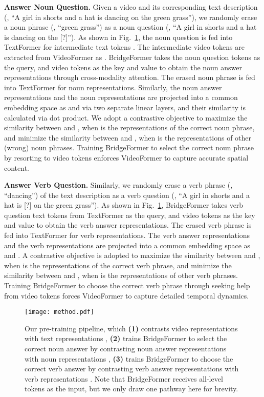 \documentclass[10pt,twocolumn,letterpaper]{article}
\begin{document}
{\flushleft \bf Answer Noun Question.} Given a video and its corresponding text description (\eg, ``A girl in shorts and a hat is dancing on the green grass''), we randomly erase a noun phrase (\eg, ``green grass'') as a noun question (\eg, ``A girl in shorts and a hat is dancing on the [?]''). As shown in Fig.~\ref{fig:method}, the noun question is fed into TextFormer for intermediate text tokens . The intermediate video tokens are extracted from VideoFormer as .  BridgeFormer takes the noun question tokens  as the query, and video tokens  as the key and value to obtain the noun answer representations through cross-modality attention. The erased noun phrase is fed into TextFormer for noun representations.  Similarly, the noun answer representations and the noun representations are projected into a common embedding space as  and  via two separate linear layers, and their similarity is calculated via dot product. We adopt a contrastive objective to maximize the similarity between  and , when  is the representations of the correct noun phrase, and minimize the similarity between   and , when  is the representations of other (wrong) noun phrases.  Training BridgeFormer to select the correct noun phrase by resorting to video tokens enforces VideoFormer to capture accurate spatial content.

{\flushleft \bf Answer Verb Question.} Similarly,  we randomly erase a verb phrase (\eg, ``dancing'') of the text description as a verb question (\eg, ``A girl in shorts and a hat is [?] on the green grass''). As shown in Fig.~\ref{fig:method}, BridgeFormer takes verb question text tokens  from TextFormer as the query, and video tokens  as the key and value to obtain the verb answer representations. The erased verb phrase is fed into TextFormer for verb representations. The verb answer representations and the verb representations are projected into a common embedding space as  and . A contrastive objective is adopted to maximize the similarity between  and , when  is the representations of the correct verb phrase, and minimize the similarity between  and , when  is the representations of other verb phrases. Training BridgeFormer to choose the correct verb phrase through seeking help from video tokens forces VideoFormer to capture detailed temporal dynamics. 


\begin{figure}
	\centering
	\texttt{[image: method.pdf]}
	\caption{Our pre-training pipeline, which \textbf{(1)} contrasts video representations  with text representations , \textbf{(2)} trains BridgeFormer to select the correct noun answer by contrasting noun answer representations  with noun representations , \textbf{(3)} trains BridgeFormer to choose the correct verb answer by contrasting verb answer representations  with verb representations . Note that BridgeFormer receives all-level tokens as the input, but we only draw one pathway here for brevity.}
	\vspace{-4mm}	
	\label{fig:method}
\end{figure}
\end{document}
